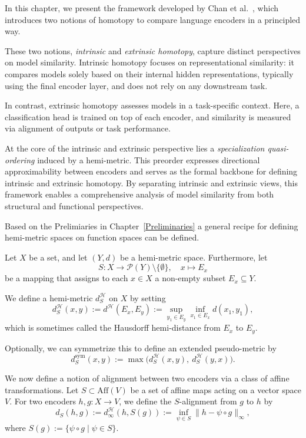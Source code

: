 In this chapter, we present the framework developed by Chan et al.~\cite{chan_affine_2024}, which introduces two notions of homotopy to compare language encoders in a principled way.
 
 These two notions, \emph{intrinsic} and \emph{extrinsic homotopy}, capture distinct perspectives on model similarity.  
 Intrinsic homotopy focuses on representational similarity: it compares models solely based on their internal hidden representations, typically using the final encoder layer, and does not rely on any downstream task.  
 
 In contrast, extrinsic homotopy assesses models in a task-specific context. Here, a classification head is trained on top of each encoder, and similarity is measured via alignment of outputs or task performance.
 
 At the core of the intrinsic and extrinsic perspective lies a \emph{specialization quasi-ordering} induced by a hemi-metric.  
 This preorder expresses directional approximability between encoders and serves as the formal backbone for defining intrinsic and extrinsic homotopy.  
 By separating intrinsic and extrinsic views, this framework enables a comprehensive analysis of model similarity from both structural and functional perspectives.
 


Based on the Prelimiaries in Chapter~\ref{Preliminaries} a general recipe for defining hemi-metric spaces on function spaces can be defined.

\begin{definition}\label{def:Hemi_Metr_Func_Space}
Let \( X \) be a set, and let \( (Y, d) \) be a hemi-metric space. Furthermore, let 
\[
S : X \to \mathcal{P}(Y) \setminus \{ \emptyset \}, \quad x \mapsto E_x
\]
be a mapping that assigns to each \( x \in X \) a non-empty subset \( E_x \subseteq Y \).

We define a hemi-metric \( d_S^{\mathcal{H}} \) on \( X \) by setting
\[
d_S^{\mathcal{H}}(x, y) := d^{\mathcal{H}}(E_x, E_y) := \sup_{y_1 \in E_y} \inf_{x_1 \in E_x} d(x_1, y_1),
\]
which is sometimes called the Hausdorff hemi-distance from \( E_x \) to \( E_y \).

Optionally, we can symmetrize this to define an extended pseudo-metric by
\[
d^{\text{sym}}_S(x, y) := \max\big( d_S^{\mathcal{H}}(x, y),\ d_S^{\mathcal{H}}(y, x) \big).
\]
\end{definition}

We now define a notion of alignment between two encoders via a class of affine transformations. Let \( S \subset \mathrm{Aff}(V) \) be a set of affine maps acting on a vector space \( V \). For two encoders \( h, g: X \to V \), we define the \( S \)-alignment from \( g \) to \( h \) by
\[
d_S(h, g) := d_\infty^{\mathcal{H}}(h, S(g)) := \inf_{\psi \in S} \| h - \psi \circ g \|_\infty,
\]
where \( S(g) := \{ \psi \circ g \mid \psi \in S \} \).

